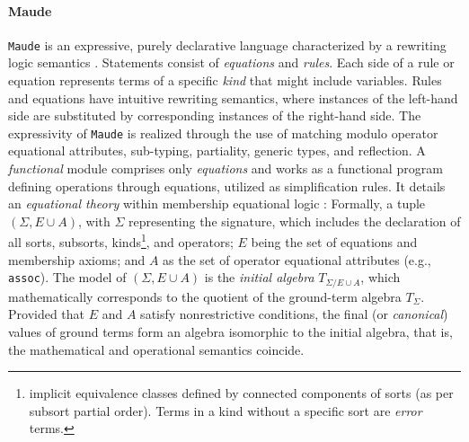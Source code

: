 
\vspace{-11pt}
\paragraph{Maude}
\texttt{Maude} \cite{maude07} is an expressive, purely declarative language characterized by a rewriting logic semantics \cite{rewlog03}. Statements consist of \emph{equations} and \emph{rules}. Each side of a rule or equation represents terms of a specific \emph{kind} that might include variables. Rules and equations have intuitive rewriting semantics, where instances of the left-hand side are substituted by corresponding instances of the right-hand side. The expressivity of \texttt{Maude} is realized through the use of matching modulo operator equational attributes, sub-typing, partiality, generic types, and reflection. A \emph{functional} module comprises only \emph{equations} and works as a functional program defining operations through equations, utilized as simplification rules. It details an \emph{equational theory} within membership equational logic \cite{membeqlog00}: Formally, a tuple $(\Sigma,E \cup A)$, with $\Sigma$ representing the signature, which includes the declaration of all sorts, subsorts, kinds\footnote{implicit equivalence classes defined by connected components of sorts (as per subsort partial order). Terms in a kind without a specific sort are \emph{error} terms.}, and operators; $E$ being the set of equations and membership axioms; and $A$ as the set of operator equational attributes (e.g., \texttt{assoc}). The model of $(\Sigma,E \cup A)$ is the \emph{initial algebra} $T_{\Sigma /E \cup A}$, which mathematically corresponds to the quotient of the ground-term algebra $T_{\Sigma}$. Provided that $E$ and $A$ satisfy nonrestrictive conditions, the final (or \emph{canonical}) values of ground terms form an algebra isomorphic to the initial algebra, that is, the mathematical and operational semantics coincide.

